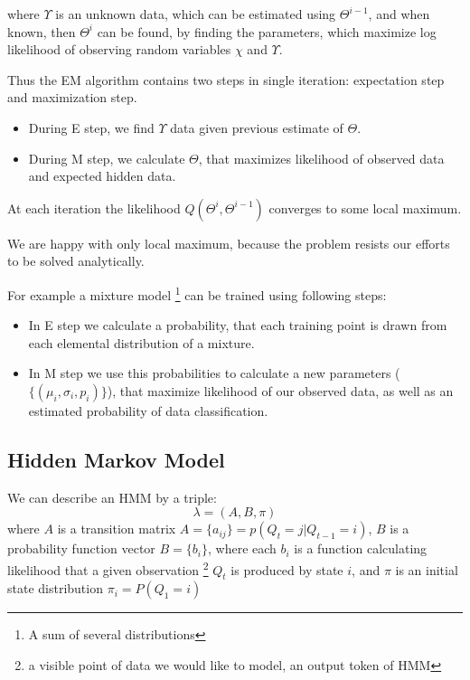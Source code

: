 \documentclass[12pt,a4paper,english]{article}
\begin{document}
 where $\Upsilon$ is an unknown data, which can be estimated using $\Theta^{i-1}$, and when known, then $\Theta^{i}$ can be found, by finding the parameters, which maximize log likelihood of observing random variables $\chi$ and $\Upsilon$. \newline


Thus the EM algorithm contains two steps in single iteration: \newline
    expectation step and maximization step. \newline
\begin{itemize}
	\item During E step, we find $\Upsilon$ data given previous estimate of $\Theta$.
	\item During M step, we calculate $\Theta$, that maximizes likelihood of observed data and expected hidden data.
\end{itemize}
At each iteration the likelihood $Q(\Theta^i,\Theta^{ i-1})$ converges to some local maximum. \newline

We are happy with only local maximum, because the problem resists our efforts to be solved analytically. \newline


For example a mixture model \footnote{A sum  of several distributions} can be trained using following steps: \newline
\begin{itemize}
    \item In E step we calculate a probability, that each training point is drawn from each elemental distribution of a mixture.
    \item In M step we use this probabilities to calculate a new parameters ($\{(\mu_i, \sigma_i, p_i)\}$), that maximize likelihood of our observed data, as well as an estimated probability of data classification.
\end{itemize}

\newpage
\subsection{Hidden Markov Model}

We can describe an HMM by a triple:
\begin{equation}
    \lambda=(A, B, \pi)
\end{equation}
 where $A$ is a transition matrix $A = \{ a_{ij} \} = p(Q_t=j | Q_{t-1}=i)$, \newline
 $B$ is a probability function vector $B = \{ b_i \}$, where each $b_i$ is a function calculating likelihood that a given observation \footnote{a visible point of data we would like to model, an output token of HMM} $Q_t$ is produced by state $i$, \newline
 and $\pi$ is an initial state distribution  $\pi_i=P(Q_1=i)$ \newline
\end{document}
